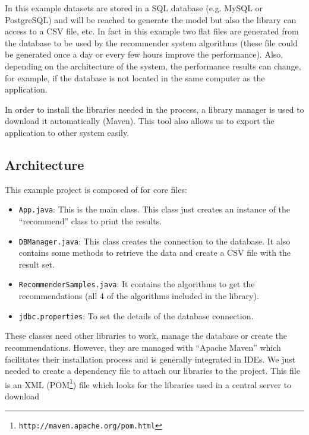 \documentclass[a4paper,10pt]{article}
\begin{document}
In this example datasets are stored in a SQL database (e.g. MySQL or PostgreSQL) and will be reached to
generate the model but also the library can access to a CSV file, etc. In fact in this example two flat files are generated from the database to be used by the recommender system algorithms (these file could be generated once a day or every few hours improve the performance). Also, depending on the architecture of the system, the performance results can change, for example, if the database is not located in the same computer as the application.

In order to install the libraries needed in the process, a library
manager is used to download it automatically (Maven). This tool also allows
us to export the application to other system easily.


\subsection{Architecture}

This example project is composed of for core files:

\begin{itemize}
    \item \texttt{App.java}: This is the main class. This class just creates an instance
    of the ``recommend'' class to print the results.
    \item \texttt{DBManager.java}: This class creates the connection to the database. It also contains some methods to retrieve the data and create a CSV file with the result set.
    \item \texttt{RecommenderSamples.java}: It contains the algorithms to get the recommendations
    (all 4 of the algorithms included in the library).
    \item \texttt{jdbc.properties}: To set the details of the database connection.
\end{itemize}

These classes need other libraries to work, manage the database or create the recommendations. However, they are managed with ``Apache Maven'' which facilitates their installation process and is generally integrated in IDEs. We just needed to create a dependency file to attach our libraries to the project. This file is an XML (POM\footnote{\texttt{http://maven.apache.org/pom.html}}) file which looks for the libraries used in a central server to download
\end{document}

